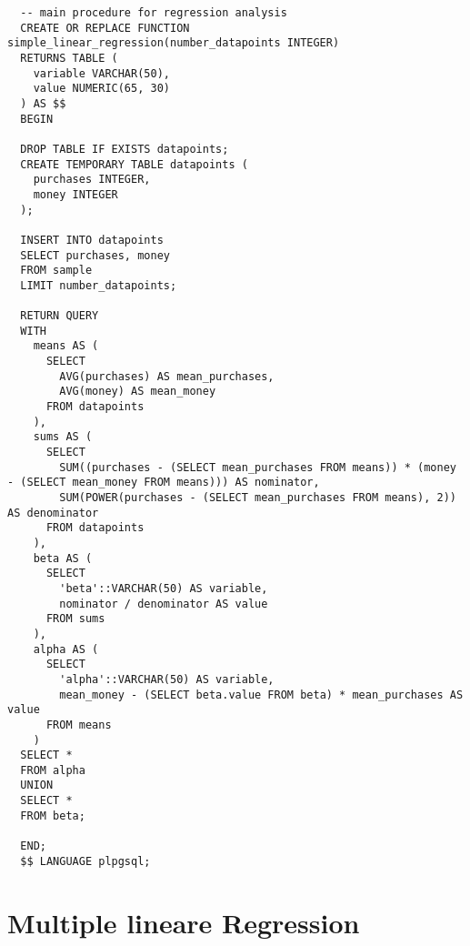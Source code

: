 \begin{verbatim}
  -- main procedure for regression analysis
  CREATE OR REPLACE FUNCTION simple_linear_regression(number_datapoints INTEGER)
  RETURNS TABLE (
    variable VARCHAR(50),
    value NUMERIC(65, 30)
  ) AS $$
  BEGIN

  DROP TABLE IF EXISTS datapoints;
  CREATE TEMPORARY TABLE datapoints (
    purchases INTEGER,
    money INTEGER
  );

  INSERT INTO datapoints
  SELECT purchases, money
  FROM sample
  LIMIT number_datapoints;

  RETURN QUERY
  WITH
    means AS (
      SELECT
        AVG(purchases) AS mean_purchases,
        AVG(money) AS mean_money
      FROM datapoints
    ),
    sums AS (
      SELECT
        SUM((purchases - (SELECT mean_purchases FROM means)) * (money - (SELECT mean_money FROM means))) AS nominator,
        SUM(POWER(purchases - (SELECT mean_purchases FROM means), 2)) AS denominator
      FROM datapoints
    ),
    beta AS (
      SELECT
        'beta'::VARCHAR(50) AS variable,
        nominator / denominator AS value
      FROM sums
    ),
    alpha AS (
      SELECT
        'alpha'::VARCHAR(50) AS variable,
        mean_money - (SELECT beta.value FROM beta) * mean_purchases AS value
      FROM means
    )
  SELECT *
  FROM alpha
  UNION
  SELECT *
  FROM beta;

  END;
  $$ LANGUAGE plpgsql;
\end{verbatim}

\section{Multiple lineare Regression}

